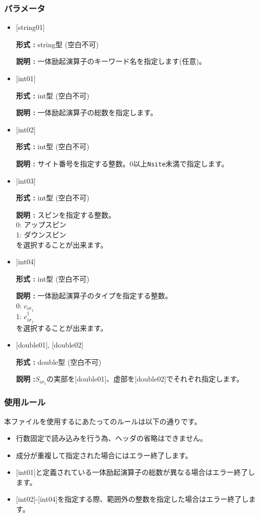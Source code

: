 \subsubsection{パラメータ}
 \begin{itemize}

   \item  $[$string01$]$
   
    {\bf 形式 :} string型 (空白不可)

   {\bf 説明 :} 一体励起演算子のキーワード名を指定します(任意)。

   \item  $[$int01$]$
   
    {\bf 形式 :} int型 (空白不可)

   {\bf 説明 :} 一体励起演算子の総数を指定します。

  \item  $[$int02$]$

 {\bf 形式 :} int型 (空白不可)

{\bf 説明 :} サイト番号を指定する整数。0以上\verb|Nsite|{未満}で指定します。
 
  \item  $[$int03$]$
  
 {\bf 形式 :} int型 (空白不可)

{\bf 説明 :} スピンを指定する整数。\\
0: アップスピン\\
1: ダウンスピン\\
を選択することが出来ます。

\item  $[$int04$]$

 {\bf 形式 :} int型 (空白不可)

{\bf 説明 :} 一体励起演算子のタイプを指定する整数。\\
0: $ c_{i\sigma_1}$\\
1: $ c_{i\sigma_1}^{\dagger}$\\
を選択することが出来ます。

\item  $[$double01$]$, $[$double02$]$

 {\bf 形式 :} double型 (空白不可)

{\bf 説明 :}$S_{i\sigma_1}$の実部を$[$double01$]$、虚部を$[$double02$]$でそれぞれ指定します。

\end{itemize}

\subsubsection{使用ルール}
本ファイルを使用するにあたってのルールは以下の通りです。
\begin{itemize}
\item 行数固定で読み込みを行う為、ヘッダの省略はできません。
\item 成分が重複して指定された場合にはエラー終了します。
\item $[$int01$]$と定義されている一体励起演算子の総数が異なる場合はエラー終了します。
\item $[$int02$]$-$[$int04$]$を指定する際、範囲外の整数を指定した場合はエラー終了します。
\end{itemize}

